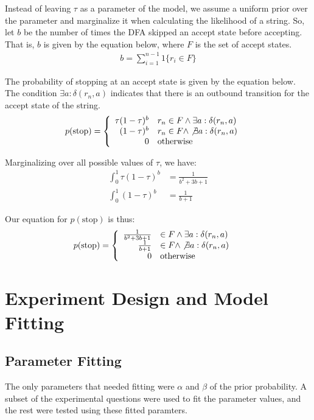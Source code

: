 \documentclass[10pt,letterpaper]{article}
\begin{document}
Instead of leaving $\tau$ as a parameter of the model, we assume a uniform prior over the parameter and marginalize it when calculating the likelihood of a string. So, let $b$ be the number of times the DFA skipped an accept state before accepting. That is, $b$ is given by the equation below, where $F$ is the set of accept states.
\begin{align*}
	b = \sum_{i=1}^{n-1} 1 \{ r_i \in F\}
\end{align*}


The probability of stopping at an accept state is given by the equation below. The condition $\exists a : \delta(r_n, a)$ indicates that there is an outbound transition for the accept state of the string.
\begin{align*}
	p(\text{stop}) &= \left\{
		\begin{array}{rl}
		\tau (1-\tau)^b & r_n \in F \wedge \exists a : \delta(r_n, a)
		\\ (1-\tau)^b & r_n \in F \wedge \not \exists a : \delta(r_n, a)
		\\ 0 & \text{otherwise}
		\end{array}
		\right.
\end{align*}

Marginalizing over all possible values of $\tau$, we have:
\begin{align*}
	\int_0^1 \tau (1-\tau)^b &= \frac{1}{b^2+3b+1}
	\\ \int_0^1 (1-\tau)^b &= \frac{1}{b+1}
\end{align*}

Our equation for $p(\text{stop})$ is thus:
\begin{align*}
	p(\text{stop}) &= \left\{
		\begin{array}{rl}
		\frac{1}{b^2+3b+1} & \in F \wedge \exists a : \delta(r_n, a)
		\\ \frac{1}{b+1} & \in F \wedge \not \exists a : \delta(r_n, a)
		\\ 0 & \text{otherwise}
		\end{array}
		\right.
\end{align*}

\section{Experiment Design and Model Fitting}
\subsection{Parameter Fitting}
The only parameters that needed fitting were $\alpha$ and $\beta$ of the prior probability. A subset of the experimental questions were used to fit the parameter values, and the rest were tested using these fitted paramters.
\end{document}
